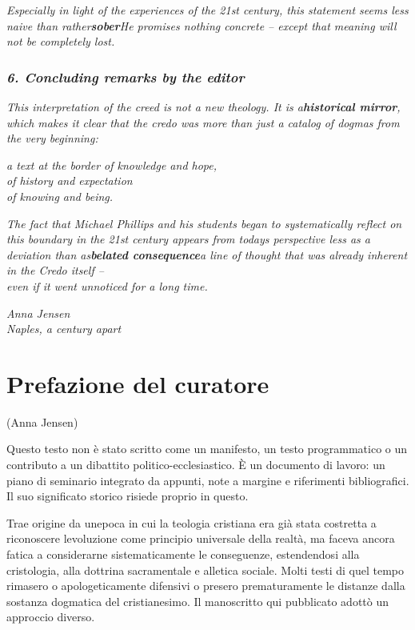 \documentclass[
]{article}
\begin{document}
\emph{Especially in light of the experiences of the 21st century, this statement seems less naive than rather\textbf{sober}He promises nothing concrete -- except that meaning will not be completely lost.}

\subsubsection{\texorpdfstring{\emph{\textbf{6. Concluding remarks by the editor}}}{6. Concluding remarks by the editor}}\label{concluding-remarks-by-the-editor}

\emph{This interpretation of the creed is not a new theology. It is a\textbf{historical mirror}, which makes it clear that the credo was more than just a catalog of dogmas from the very beginning:}

\emph{a text at the border of knowledge and hope,\\
of history and expectation\\
of knowing and being.}

\emph{The fact that Michael Phillips and his students began to systematically reflect on this boundary in the 21st century appears from today\textquotesingle s perspective less as a deviation than as\textbf{belated consequence}a line of thought that was already inherent in the Credo itself --\\
even if it went unnoticed for a long time.}

\emph{Anna Jensen\\
Naples, a century apart}

\section{Prefazione del curatore}\label{prefazione-del-curatore}

(Anna Jensen)

Questo testo non è stato scritto come un manifesto, un testo programmatico o un contributo a un dibattito politico-ecclesiastico. È un documento di lavoro: un piano di seminario integrato da appunti, note a margine e riferimenti bibliografici. Il suo significato storico risiede proprio in questo.

Trae origine da un\textquotesingle epoca in cui la teologia cristiana era già stata costretta a riconoscere l\textquotesingle evoluzione come principio universale della realtà, ma faceva ancora fatica a considerarne sistematicamente le conseguenze, estendendosi alla cristologia, alla dottrina sacramentale e all\textquotesingle etica sociale. Molti testi di quel tempo rimasero o apologeticamente difensivi o presero prematuramente le distanze dalla sostanza dogmatica del cristianesimo. Il manoscritto qui pubblicato adottò un approccio diverso.
\end{document}
